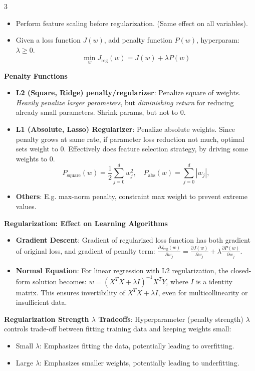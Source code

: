 \documentclass[a4paper, 9pt, landscape]{article}
\begin{document}
\begin{multicols*}{3}
\begin{itemize}[itemsep=-1pt, topsep=0.5pt]
\item Perform feature scaling before regularization. (Same effect on all variables).
\item Given a loss function $ J(w) $, add penalty function $ P(w) $, hyperparam: $ \lambda \geq 0 $. 
\[\min_w J_{\text{reg}}(w) = J(w) + \lambda P(w)\]
\end{itemize}
\textbf{Penalty Functions}
\begin{itemize}[itemsep=-1pt]
    \item \textbf{L2 (Square, Ridge) penalty/regularizer}: Penalize square of weights. \\
     \textit{Heavily penalize larger parameters}, but \textit{diminishing return} for reducing already small parameters. Shrink params, but not to 0.
    \item \textbf{L1 (Absolute, Lasso) Regularizer}: Penalize absolute weights. Since penalty grows at same rate, if parameter loss reduction not much, optimal sets weight to 0. Effectively does feature selection strategy, by driving some weights to 0.
    {\scriptsize
    \[P_{\text{square}}(w) = \frac{1}{2} \sum_{j=0}^d w_j^2, \quad P_{\text{abs}}(w) = \sum_{j=0}^d |w_j|, \]
	}
    \item \textbf{Others}: E.g. max-norm penalty, constraint max weight to prevent extreme values.
\end{itemize}

\textbf{Regularization: Effect on Learning Algorithms}
\begin{itemize}[itemsep=-2pt]
    \item \textbf{Gradient Descent}: Gradient of regularized loss function has both gradient of original loss, and gradient of penalty term: $\frac{\partial J_{\text{reg}}(w)}{\partial w_j} = \frac{\partial J(w)}{\partial w_j} + \lambda \frac{\partial P(w)}{\partial w_j}.$

    \item \textbf{Normal Equation}: For linear regression with L2 regularization, the closed-form solution becomes:
    $w = (X^T X + \lambda I)^{-1} X^T Y $, where $ I $ is a identity matrix. This ensures invertibility of $ X^T X + \lambda I $, even for multicollinearity or insufficient data.
\end{itemize}

\textbf{Regularization Strength $ \lambda $ Tradeoffs}: Hyperparameter (penalty strength) $ \lambda $ controls trade-off between fitting training data and keeping weights small:
\begin{itemize}[itemsep=-2pt]
    \item Small $ \lambda $: Emphasizes fitting the data, potentially leading to overfitting.
    \item Large $ \lambda $: Emphasizes smaller weights, potentially leading to underfitting.
\end{itemize}


\end{multicols*}
\end{document}
